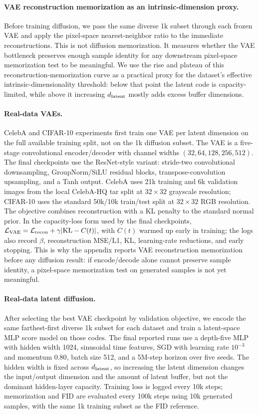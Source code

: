 \paragraph{VAE reconstruction memorization as an intrinsic-dimension proxy.}
Before training diffusion, we pass the same diverse 1k subset through each
frozen VAE and apply the pixel-space nearest-neighbor ratio to the immediate
reconstructions. This is not diffusion memorization. It measures whether the
VAE bottleneck preserves enough sample identity for any downstream pixel-space
memorization test to be meaningful. We use the rise and plateau of this
reconstruction-memorization curve as a practical proxy for the dataset's
effective intrinsic-dimensionality threshold: below that point the latent code
is capacity-limited, while above it increasing $d_{\mathrm{latent}}$ mostly adds excess
buffer dimensions.

\paragraph{Real-data VAEs.}
CelebA and CIFAR-10 experiments first train one VAE per latent dimension on the
full available training split, not on the 1k diffusion subset. The VAE is a
five-stage convolutional encoder/decoder with channel widths
$(32,64,128,256,512)$. The final checkpoints use the ResNet-style variant:
stride-two convolutional downsampling, GroupNorm/SiLU residual blocks,
transpose-convolution upsampling, and a Tanh output. CelebA uses 21k training
and 6k validation images from the local CelebA-HQ tar split at $32\times32$
grayscale resolution; CIFAR-10 uses the standard 50k/10k train/test split at
$32\times32$ RGB resolution. The objective combines reconstruction with a KL
penalty to the standard normal prior. In the capacity-loss form used by the
final checkpoints, $\mathcal L_{\rm VAE}=\mathcal L_{\rm recon}+
\gamma|\mathrm{KL}-C(t)|$, with $C(t)$ warmed up early in training; the logs
also record $\beta$, reconstruction MSE/L1, KL, learning-rate reductions, and
early stopping. This is why the appendix reports VAE reconstruction
memorization before any diffusion result: if encode/decode alone cannot
preserve sample identity, a pixel-space memorization test on generated samples
is not yet meaningful.

\paragraph{Real-data latent diffusion.}
After selecting the best VAE checkpoint by validation objective, we encode the
same farthest-first diverse 1k subset for each dataset and train a latent-space
MLP score model on those codes. The final reported runs use a depth-five MLP with hidden width 1024, sinusoidal time features, SGD with learning rate
$10^{-3}$ and momentum $0.80$, batch size 512, and a 5M-step horizon over five
seeds. The hidden width is fixed across $d_{\mathrm{latent}}$, so increasing the latent
dimension changes the input/output dimension and the amount of latent buffer,
but not the dominant hidden-layer capacity. Training loss is logged every 10k
steps; memorization and FID are evaluated every 100k steps using 10k generated samples, with the same 1k training subset as the FID reference.

